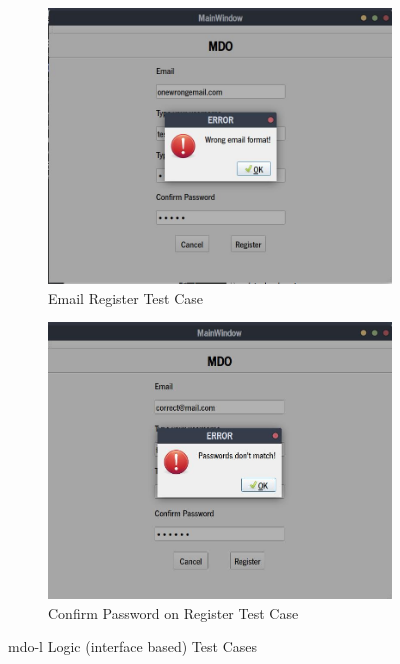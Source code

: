 \begin{figure}[htb!]
  \centering
  \begin{subfigure}{.45\textwidth}
    \includegraphics[width=\textwidth]{img/rc-email-test.jpg}%
  \caption{Email Register Test Case}%
  \label{fig:rc-email-test}
  \end{subfigure}
  \begin{subfigure}{.45\textwidth}
    \includegraphics[width=\textwidth]{img/rc-password-test.jpg}%
  \caption{Confirm Password on Register Test Case}%
  \label{fig:rc-password-test}
  \end{subfigure}
  \caption{\gls{mdo-l} Logic (interface based) Test Cases}%
  \label{fig:rc-interface-test}
\end{figure}

